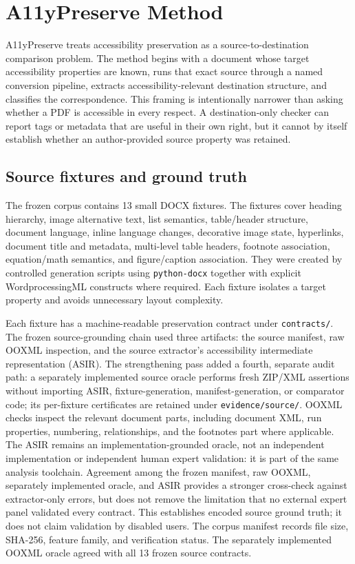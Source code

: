 \section{A11yPreserve Method}
\label{sec:method}

A11yPreserve treats accessibility preservation as a source-to-destination comparison problem. The method begins with a document whose target accessibility properties are known, runs that exact source through a named conversion pipeline, extracts accessibility-relevant destination structure, and classifies the correspondence. This framing is intentionally narrower than asking whether a PDF is accessible in every respect. A destination-only checker can report tags or metadata that are useful in their own right, but it cannot by itself establish whether an author-provided source property was retained.

\subsection{Source fixtures and ground truth}

The frozen corpus contains 13 small DOCX fixtures. The fixtures cover heading hierarchy, image alternative text, list semantics, table/header structure, document language, inline language changes, decorative image state, hyperlinks, document title and metadata, multi-level table headers, footnote association, equation/math semantics, and figure/caption association. They were created by controlled generation scripts using \texttt{python-docx} together with explicit WordprocessingML constructs where required. Each fixture isolates a target property and avoids unnecessary layout complexity.

Each fixture has a machine-readable preservation contract under \texttt{contracts/}. The frozen source-grounding chain used three artifacts: the source manifest, raw OOXML inspection, and the source extractor's accessibility intermediate representation (ASIR). The strengthening pass added a fourth, separate audit path: a separately implemented source oracle performs fresh ZIP/XML assertions without importing ASIR, fixture-generation, manifest-generation, or comparator code; its per-fixture certificates are retained under \texttt{evidence/source/}. OOXML checks inspect the relevant document parts, including document XML, run properties, numbering, relationships, and the footnotes part where applicable. The ASIR remains an implementation-grounded oracle, not an independent implementation or independent human expert validation: it is part of the same analysis toolchain. Agreement among the frozen manifest, raw OOXML, separately implemented oracle, and ASIR provides a stronger cross-check against extractor-only errors, but does not remove the limitation that no external expert panel validated every contract. This establishes encoded source ground truth; it does not claim validation by disabled users. The corpus manifest records file size, SHA-256, feature family, and verification status.
The separately implemented OOXML oracle agreed with all 13 frozen source contracts.

